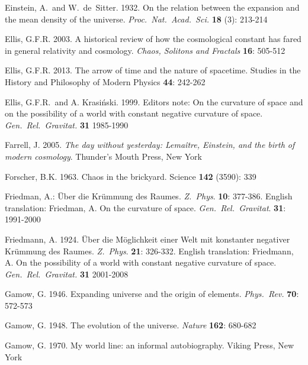 \documentclass[12 pt]{article}
\begin{document}
\begin{thebibliography}{}
 Einstein, A.\ and W.\ de~Sitter. 1932. On the relation between the expansion and the mean density of the universe. \textit{Proc.\ Nat.\ Acad.\ Sci.} \textbf{18} (3): 213-214

 Ellis, G.F.R. 2003. A historical review of how the cosmological constant has fared in general relativity and cosmology. \textit{Chaos, Solitons and Fractals} \textbf{16}: 505-512

 Ellis, G.F.R. 2013. The arrow of time and the nature of spacetime. Studies in the History and Philosophy of Modern Physics \textbf{44}: 242-262

 Ellis, G.F.R.\ and A. Krasi\'{n}ski. 1999. Editors note: On the curvature of space and on the possibility of a world with constant negative curvature of space. \textit{Gen.\ Rel.\ Gravitat.} \textbf{31} 1985-1990

 Farrell, J. 2005. \textit{The day without yesterday: Lema\^{i}tre, Einstein, and the birth of modern cosmology}. Thunder’s Mouth Press, New York

 Forscher, B.K. 1963. Chaos in the brickyard. Science \textbf{142} (3590): 339

 Friedman, A.: \"{U}ber die Kr\"{u}mmung des Raumes. \textit{Z.\ Phys}. \textbf{10}: 377-386. English translation: Friedman, A. On the curvature of space. \textit{Gen.\ Rel.\ Gravitat}. \textbf{31}: 1991-2000
 
 Friedmann, A. 1924. \"{U}ber die M\"{o}glichkeit einer Welt mit konstanter negativer Kr\"{u}mmung des Raumes. \textit{Z.\ Phys}. \textbf{21}: 326-332. English translation: Friedmann, A. On the possibility of a world with constant negative curvature of space. \textit{Gen.\ Rel.\ Gravitat.} \textbf{31} 2001-2008

 Gamow, G. 1946. Expanding universe and the origin of elements. \textit{Phys.\ Rev.} \textbf{70}: 572-573

 Gamow, G. 1948. The evolution of the universe. \textit{Nature} \textbf{162}: 680-682

 Gamow, G. 1970. My world line: an informal autobiography. Viking Press, New York


\end{thebibliography}
\end{document}
